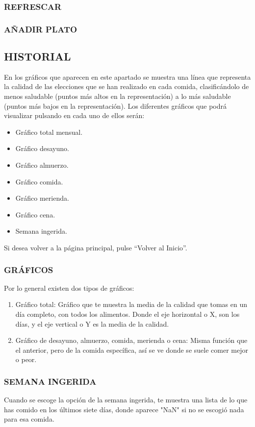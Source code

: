 \subsubsection{REFRESCAR}
\subsubsection{AÑADIR PLATO}
\subsection{HISTORIAL}
En los gráficos que aparecen en este apartado se muestra una línea que representa la calidad de las elecciones que se han realizado en cada comida, clasificándolo de menos saludable (puntos más altos en la representación) a lo más saludable (puntos más bajos en la representación).
Los diferentes gráficos que podrá visualizar pulsando en cada uno de ellos serán:
\begin{itemize}
\item	Gráfico total mensual.
\item	Gráfico desayuno.
\item	Gráfico almuerzo.
\item	Gráfico comida.
\item	Gráfico merienda.
\item	Gráfico cena.
\item	Semana ingerida.
\end{itemize}	

Si desea volver a la página principal, pulse “Volver al Inicio”.
\subsubsection{GRÁFICOS}
Por lo general existen dos tipos de gráficos:
\begin{enumerate}
\item Gráfico total: Gráfico que te muestra la media de la calidad que tomas en un día completo, con todos los alimentos. Donde el eje horizontal o X, son los días, y el eje vertical o Y es la media de la calidad.
\item Gráfico de desayuno, almuerzo, comida, merienda o cena: Misma función que el anterior, pero de la comida específica, así se ve donde se suele comer mejor o peor.
\end{enumerate}
\subsubsection{SEMANA INGERIDA}
Cuando se escoge la opción de la semana ingerida, te muestra una lista de lo que has comido en los últimos siete días, donde aparece "NaN" si no se escogió nada para esa comida.